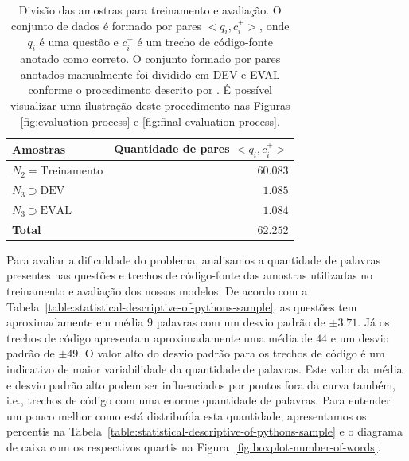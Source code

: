 \begin{table}[h]
\centering
\begin{tabular}{ p{5cm} r  }
 \hline
 \textbf{Amostras} & \textbf{Quantidade de pares $<q_{i}, c_{i}^{+}>$}\\
 \hline
 $N_{2} = \text{Treinamento}$ & $60.083$\\
 
 $N_{3} \supset \text{DEV}$ & $1.085$ \\
 
 $N_{3} \supset \text{EVAL}$ & $1.084$\\
 \hline
 \textbf{Total} & $\bm{62.252}$\\
 \hline
\end{tabular}
\caption{Divisão das amostras para treinamento e avaliação. O conjunto de dados é formado por pares $<q_{i}, c_{i}^{+}>$, onde $q_{i}$ é uma questão e $c_{i}^{+}$ é um trecho de código-fonte anotado como correto. O conjunto formado por pares anotados manualmente foi dividido em DEV e EVAL conforme o procedimento descrito por \cite{iyer-etal-2016-summarizing}. É possível visualizar uma ilustração deste procedimento nas Figuras \ref{fig:evaluation-process} e \ref{fig:final-evaluation-process}.}
\label{table:divisao-amostras}
\end{table}


Para avaliar a dificuldade do problema, analisamos a quantidade de palavras presentes nas questões e trechos de código-fonte das amostras utilizadas no treinamento e avaliação dos nossos modelos. De acordo com a Tabela~\ref{table:statistical-descriptive-of-pythons-sample}, as questões tem aproximadamente em média $9$ palavras com um desvio padrão de $\pm 3.71$. Já os trechos de código apresentam aproximadamente uma média de $44$ e um desvio padrão de $\pm 49$. O valor alto do desvio padrão para os trechos de código é um indicativo de maior variabilidade da quantidade de palavras. Este valor da média e desvio padrão alto podem ser influenciados por pontos fora da curva também, i.e., trechos de código com uma enorme quantidade de palavras. Para entender um pouco melhor como está distribuída esta quantidade, apresentamos os percentis na Tabela~\ref{table:statistical-descriptive-of-pythons-sample} e o diagrama de caixa com os respectivos quartis na Figura~\ref{fig:boxplot-number-of-words}.

